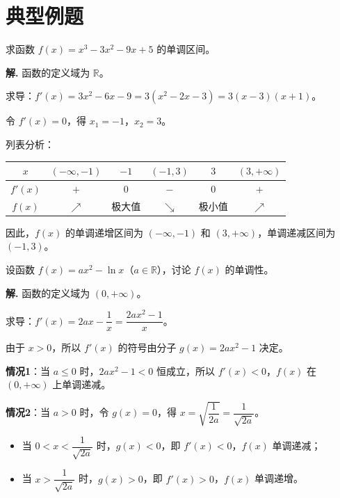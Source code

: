 \documentclass[11pt]{ctexrep}
\begin{document}
\section*{典型例题}

\begin{example}[利用导数求单调区间]
    求函数 $f(x) = x^3 - 3x^2 - 9x + 5$ 的单调区间。
\end{example}

\textbf{解.} 函数的定义域为 $\mathbb{R}$。

求导：$f'(x) = 3x^2 - 6x - 9 = 3(x^2 - 2x - 3) = 3(x - 3)(x + 1)$。

令 $f'(x) = 0$，得 $x_1 = -1$，$x_2 = 3$。

列表分析：
\begin{center}
\begin{tabular}{c|ccccc}
\hline
$x$ & $(-\infty, -1)$ & $-1$ & $(-1, 3)$ & $3$ & $(3, +\infty)$ \\
\hline
$f'(x)$ & $+$ & $0$ & $-$ & $0$ & $+$ \\
\hline
$f(x)$ & $\nearrow$ & 极大值 & $\searrow$ & 极小值 & $\nearrow$ \\
\hline
\end{tabular}
\end{center}

因此，$f(x)$ 的单调递增区间为 $(-\infty, -1)$ 和 $(3, +\infty)$，单调递减区间为 $(-1, 3)$。

\begin{example}[含参函数的单调性讨论]
    设函数 $f(x) = ax^2 - \ln x$（$a \in \mathbb{R}$），讨论 $f(x)$ 的单调性。
\end{example}

\textbf{解.} 函数的定义域为 $(0, +\infty)$。

求导：$f'(x) = 2ax - \dfrac{1}{x} = \dfrac{2ax^2 - 1}{x}$。

由于 $x > 0$，所以 $f'(x)$ 的符号由分子 $g(x) = 2ax^2 - 1$ 决定。

\textbf{情况1}：当 $a \le 0$ 时，$2ax^2 - 1 < 0$ 恒成立，所以 $f'(x) < 0$，$f(x)$ 在 $(0, +\infty)$ 上单调递减。

\textbf{情况2}：当 $a > 0$ 时，令 $g(x) = 0$，得 $x = \sqrt{\dfrac{1}{2a}} = \dfrac{1}{\sqrt{2a}}$。

\begin{itemize}
    \item 当 $0 < x < \dfrac{1}{\sqrt{2a}}$ 时，$g(x) < 0$，即 $f'(x) < 0$，$f(x)$ 单调递减；
    \item 当 $x > \dfrac{1}{\sqrt{2a}}$ 时，$g(x) > 0$，即 $f'(x) > 0$，$f(x)$ 单调递增。
\end{itemize}
\end{document}
